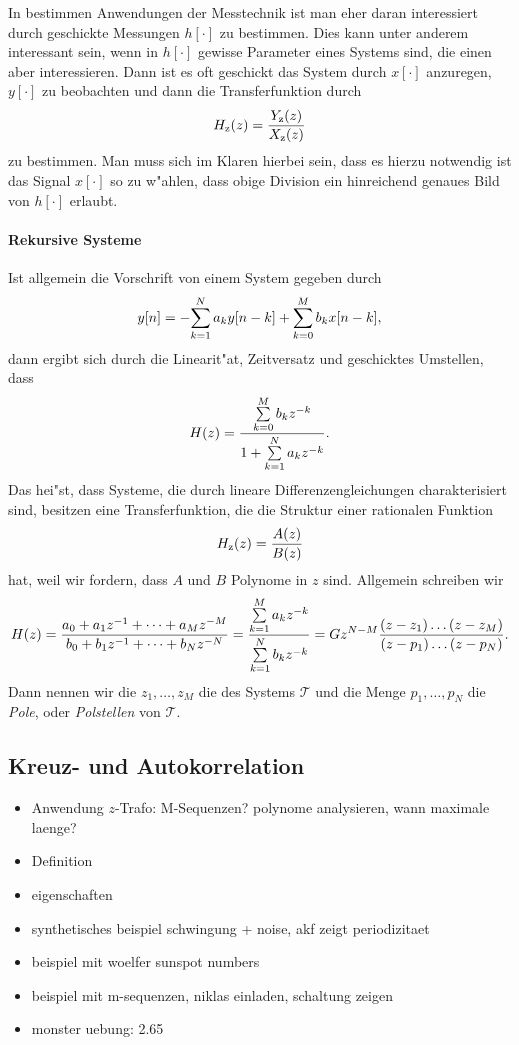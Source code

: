 In bestimmen Anwendungen der Messtechnik ist man eher daran interessiert durch geschickte Messungen $h[\cdot]$ zu bestimmen.
Dies kann unter anderem interessant sein, wenn in $h[\cdot]$ gewisse Parameter eines Systems  sind, die einen aber interessieren.
Dann ist es oft geschickt das System durch $x[\cdot]$ anzuregen, $y[\cdot]$ zu beobachten und dann die Transferfunktion durch
\[
H_{\rm z}(z) = \frac{Y_{\rm z}(z)}{X_{\rm z}(z)}
\]
zu bestimmen.
Man muss sich im Klaren hierbei sein, dass es hierzu notwendig ist das Signal $x[\cdot]$ so zu w"ahlen, dass obige Division ein hinreichend genaues Bild von $h[\cdot]$ erlaubt.
%
%
\paragraph{Rekursive Systeme}
Ist allgemein die Vorschrift von einem System gegeben durch
\[
y[n] = -{\sum\limits_{k=1}^{N}{a_k y[n-k]}} + {\sum\limits_{k=0}^{M}{b_k x[n - k]}},
\]
dann ergibt sich durch die Linearit"at, Zeitversatz und geschicktes Umstellen, dass
\[
    H(z) = \frac{{\sum\limits_{k=0}^{M}{b_k z^{-k}}}}{1 + {\sum\limits_{k=1}^{N}{a_k z^{-k}}}}.
\]
Das hei"st, dass Systeme, die durch lineare Differenzengleichungen charakterisiert sind, besitzen eine Transferfunktion, die die Struktur einer rationalen Funktion
\[
H_{\rm z}(z) = \frac{A(z)}{B(z)}
\]
hat, weil wir fordern, dass $A$ und $B$ Polynome in $z$ sind.
Allgemein schreiben wir
\[
H(z) = 
    \frac{
        a_0 + a_1 z^{-1} + \dots + a_M z^{-M}
    }{
        b_0 + b_1 z^{-1} + \dots + b_N z^{-N}
    }
    = \frac{
        {\sum\limits_{k = 1}^{M}{a_k z^{-k}}}
    }{
        {\sum\limits_{k = 1}^{N}{b_k z^{-k}}}
    }
    = G z^{N - M} \frac{
        (z - z_1) \dots (z - z_M)
    }{
        (z - p_1) \dots (z - p_N)
    }.
\]
Dann nennen wir die $z_1, \dots, z_M$ die  des Systems $\mathcal{T}$ und die Menge $p_1,\dots,p_N$ die \emph{Pole}, oder \emph{Polstellen} von $\mathcal{T}$.
\subsection{Kreuz- und Autokorrelation}\label{corr}

\begin{itemize}
    \item Anwendung $z$-Trafo: M-Sequenzen? polynome analysieren, wann maximale laenge?
    \item Definition
    \item eigenschaften
    \item synthetisches beispiel schwingung + noise, akf zeigt periodizitaet
    \item beispiel mit woelfer sunspot numbers
    \item beispiel mit m-sequenzen, niklas einladen, schaltung zeigen
    \item monster uebung: 2.65
\end{itemize}
